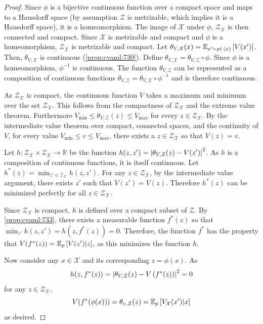 \begin{proof}
    
Since $\phi$ is a bijective continuous function over a compact space and maps to a Hausdorff space (by assumption $\mathcal{Z}$ is metrizable, which implies it is a Hausdorff space), it is a homeomorphism.
The image of $\mathcal{X}$ under $\phi$, $\mathcal{Z}_\mathcal{X}$ is then connected and compact.
Since $\mathcal{X}$ is metrizable and compact and $\phi$ is a homeomorphism, $\mathcal{Z}_\mathcal{X}$ is metrizable and compact.
Let $\theta_{V,\mathcal{X}}(x) = \mathbb{E}_{x' \sim p(\cdot|x)}\left[  V(x') \right]$.
Then, $\theta_{V,\mathcal{X}}$ is continuous (\autoref{prop:cvaml:730}).
Define $\theta_{V, \mathcal{X}} = \theta_{V, \mathcal{Z}} \circ \phi$.
Since $\phi$ is a homeomorphism, $\phi^{-1}$ is continuous.
The function $\theta_{V, \mathcal{Z}}$ can be represented as a composition of continuous functions $\theta_{V, \mathcal{Z}} = \theta_{V, \mathcal{X}} \circ \phi^{-1}$ and is therefore continuous.

As $\mathcal{Z}_\mathcal{X}$ is compact, the continuous function $V$ takes a maximum and minimum over the set $\mathcal{Z}_\mathcal{X}$. 
This follows from the compactness of $\mathcal{Z}_\mathcal{X}$ and the extreme value theorem. 
Furthermore $V_{\min} \leq \theta_{V,\mathcal{Z}}(z) \leq V_{\max}$ for every $z \in \mathcal{Z}_\mathcal{X}$.
By the intermediate value theorem over compact, connected spaces, and the continuity of $V$, for every value $V_{\min} \leq v \leq V_{\max}$, there exists a $z \in \mathcal{Z}_\mathcal{X}$ so that $V(z) = v$.


Let $h: \mathcal{Z}_\mathcal{X} \times \mathcal{Z}_\mathcal{X} \rightarrow \mathbb{R}$ be the function $h(z,z') = \left|\theta_{V,\mathcal{Z}}(z) - V(z')\right|^2$.
As $h$ is a composition of continuous functions, it is itself continuous.
Let $h^*(z) = \min_{z' \in \mathcal{Z}_\mathcal{X}} h(z,z')$.
For any $z \in \mathcal{Z}_\mathcal{X}$, by the intermediate value argument, there exists $z'$ such that $V(z') = V(z)$. 
Therefore $h^*(z)$ can be minimized perfectly for all $z \in \mathcal{Z}_\mathcal{X}$.

Since $\mathcal{Z}_\mathcal{X}$ is compact, $h$ is defined over a compact subset of $\mathcal{Z}$.
By \autoref{prop:cvaml:733}, there exists a measurable function $f^*(z)$ so that $\min_{z'} h(z, z') = h(z, f^*(z)) = 0$.
Therefore, the function $f^*$ has the property that $V(f^*(z)) = \mathbb{E}_{p}\left[  V(z')|z \right]$, as this minimizes the function $h$.

Now consider any $x\in\mathcal{X}$ and its corresponding $z=\phi(x)$.
As $$h(z, f^*(z))=\left|\theta_{V,\mathcal{Z}}(z) - V\left( f^*(z) \right)\right|^2  = 0$$ for any $z \in \mathcal{Z}_\mathcal{X}$, $$V(f^*(\phi(x))) = \theta_{v,\mathcal{Z}}(z) = \mathbb{E}_{p}\left[  V_\mathcal{X}(x')|x \right]$$ as desired.

\end{proof}

